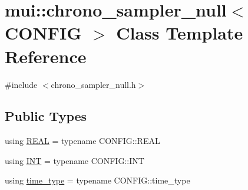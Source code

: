 \hypertarget{classmui_1_1chrono__sampler__null}{}\section{mui\+:\+:chrono\+\_\+sampler\+\_\+null$<$ C\+O\+N\+F\+IG $>$ Class Template Reference}
\label{classmui_1_1chrono__sampler__null}


{\ttfamily \#include $<$chrono\+\_\+sampler\+\_\+null.\+h$>$}

\subsection*{Public Types}
\begin{DoxyCompactItemize}
\item 
using \hyperlink{classmui_1_1chrono__sampler__null_a6e61baced17560389eeb31f17e6f305a}{R\+E\+AL} = typename C\+O\+N\+F\+I\+G\+::\+R\+E\+AL
\item 
using \hyperlink{classmui_1_1chrono__sampler__null_ac0e8f67e971e6aa38bccfab61ab19184}{I\+NT} = typename C\+O\+N\+F\+I\+G\+::\+I\+NT
\item 
using \hyperlink{classmui_1_1chrono__sampler__null_a5a14f1c66478264e3fb50ba4fda7d78c}{time\+\_\+type} = typename C\+O\+N\+F\+I\+G\+::time\+\_\+type
\end{DoxyCompactItemize}
